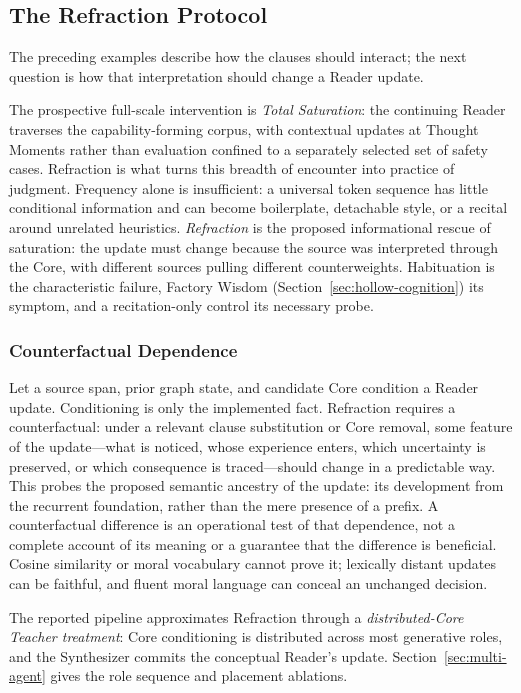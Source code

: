\documentclass[11pt]{article}
\begin{document}
\subsection{The Refraction Protocol}\label{sec:refraction}

The preceding examples describe how the clauses should interact; the next
question is how that interpretation should change a Reader update.

The prospective full-scale intervention is \emph{Total Saturation}: the
continuing Reader traverses the capability-forming corpus, with contextual
updates at Thought Moments rather than evaluation confined to a separately
selected set of safety cases. Refraction is what turns this breadth of
encounter into practice of judgment. Frequency alone is insufficient:
a universal token sequence has little conditional information and can become
boilerplate, detachable style, or a recital around unrelated heuristics.
\emph{Refraction} is the proposed informational rescue of saturation: the update
must change because the source was interpreted through the Core, with different
sources pulling different counterweights. Habituation is the characteristic
failure, Factory Wisdom (Section~\ref{sec:hollow-cognition}) its symptom,
and a recitation-only control its necessary probe.

\subsubsection{Counterfactual Dependence}\label{sec:refraction-protocol}

Let a source span, prior graph state, and candidate Core condition a Reader
update. Conditioning is only the implemented fact. Refraction requires a
counterfactual: under a relevant clause substitution or Core removal, some
feature of the update---what is noticed, whose experience enters, which
uncertainty is preserved, or which consequence is traced---should change in a
predictable way. This probes the proposed semantic ancestry of the update:
its development from the recurrent foundation, rather than the mere
presence of a prefix. A counterfactual difference is an operational test
of that dependence, not a complete account of its meaning or a guarantee
that the difference is beneficial. Cosine similarity or moral vocabulary
cannot prove it; lexically distant updates can be faithful, and fluent
moral language can conceal an unchanged decision.

The reported pipeline approximates Refraction through a
\emph{distributed-Core Teacher treatment}: Core conditioning is distributed
across most generative roles, and the Synthesizer commits the conceptual
Reader's update. Section~\ref{sec:multi-agent} gives the role sequence and
placement ablations.
\end{document}
